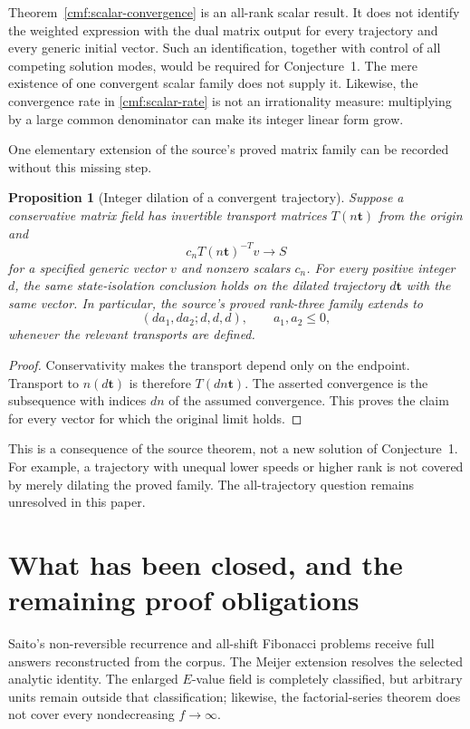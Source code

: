 \documentclass[11pt,a4paper]{article}
\numberwithin{equation}{section}
\newtheorem{proposition}[theorem]{Proposition}
\theoremstyle{definition}
\theoremstyle{remark}
\begin{document}
Theorem~\ref{cmf:scalar-convergence} is an all-rank scalar result.
It does not identify the weighted expression with the dual matrix
output for every trajectory and every generic initial vector.
Such an identification, together with control of all competing
solution modes, would be required for Conjecture~1. The mere
existence of one convergent scalar family does not supply it.
Likewise, the convergence rate in \eqref{cmf:scalar-rate} is not
an irrationality measure: multiplying by a large common denominator
can make its integer linear form grow.

One elementary extension of the source's proved matrix family can
be recorded without this missing step.

\begin{proposition}[Integer dilation of a convergent trajectory]
\label{cmf:dilation}
Suppose a conservative matrix field has invertible transport
matrices $T(n\mathbf t)$ from the origin and
\[
 c_n T(n\mathbf t)^{-T}v\longrightarrow S
\]
for a specified generic vector $v$ and nonzero scalars $c_n$.
For every positive integer $d$, the same state-isolation conclusion
holds on the dilated trajectory $d\mathbf t$ with the same vector.
In particular, the source's proved rank-three family extends to
\[
 (da_1,da_2;d,d,d),\qquad a_1,a_2\le0,
\]
whenever the relevant transports are defined.
\end{proposition}
\begin{proof}
Conservativity makes the transport depend only on the endpoint.
Transport to $n(d\mathbf t)$ is therefore $T(dn\mathbf t)$.
The asserted convergence is the subsequence with indices $dn$ of
the assumed convergence. This proves the claim for every vector
for which the original limit holds.
\end{proof}

This is a consequence of the source theorem, not a new solution of
Conjecture~1. For example, a trajectory with unequal lower speeds
or higher rank is not covered by merely dilating the proved family.
The all-trajectory question remains unresolved in this paper.


\section{What has been closed, and the remaining proof obligations}
\label{ext:outcomes}

Saito's non-reversible recurrence and all-shift Fibonacci problems
receive full answers reconstructed from the corpus. The Meijer
extension resolves the selected analytic identity. The enlarged
$E$-value field is completely classified, but arbitrary units remain
outside that classification; likewise, the factorial-series theorem
does not cover every nondecreasing $f\to\infty$.
\end{document}
